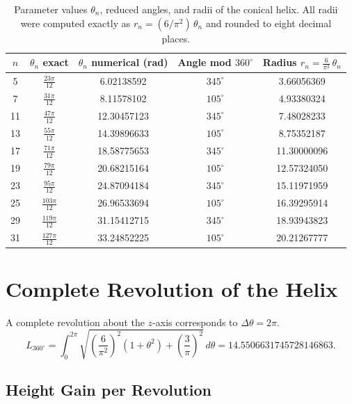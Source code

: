 \begin{table}[ht!]
\centering
\caption{Parameter values $\theta_n$, reduced angles, and radii of the conical helix.
  All radii were computed exactly as $r_n = (6/\pi^2)\,\theta_n$ and
  rounded to eight decimal places.}
\begin{tabular}{c c c c c}
\hline
$n$ 
& $\theta_n$ exact 
& $\theta_n$ numerical (rad) 
& Angle mod $360^\circ$ 
& Radius $r_n = \frac{6}{\pi^2}\,\theta_n$ \\
\hline
 5 & $\frac{23\pi}{12}$  & 6.02138592  & $345^\circ$ & 3.66056369 \\
 7 & $\frac{31\pi}{12}$  & 8.11578102  & $105^\circ$ & 4.93380324 \\
11 & $\frac{47\pi}{12}$  & 12.30457123 & $345^\circ$ & 7.48028233 \\
13 & $\frac{55\pi}{12}$  & 14.39896633 & $105^\circ$ & 8.75352187 \\
17 & $\frac{71\pi}{12}$  & 18.58775653 & $345^\circ$ & 11.30000096 \\
19 & $\frac{79\pi}{12}$  & 20.68215164 & $105^\circ$ & 12.57324050 \\
23 & $\frac{95\pi}{12}$  & 24.87094184 & $345^\circ$ & 15.11971959 \\
25 & $\frac{103\pi}{12}$ & 26.96533694 & $105^\circ$ & 16.39295914 \\
29 & $\frac{119\pi}{12}$ & 31.15412715 & $345^\circ$ & 18.93943823 \\
31 & $\frac{127\pi}{12}$ & 33.24852225 & $105^\circ$ & 20.21267777 \\
\hline
\end{tabular}
\end{table}

\section{Complete Revolution of the Helix}

A complete revolution about the $z$-axis corresponds to $\Delta\theta = 2\pi$.
\begin{equation}
L_{360^\circ}
= \int_{0}^{2\pi}
\sqrt{
\left(\frac{6}{\pi^2}\right)^2(1+\theta^2)
+ \left(\frac{3}{\pi}\right)^2
}\, d\theta
= \boxed{14.5506631745728146863}.
\end{equation}

\subsection{Height Gain per Revolution}

